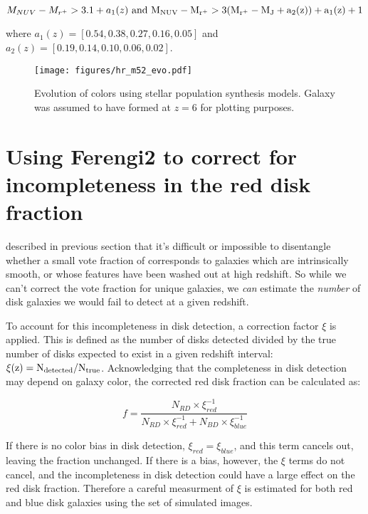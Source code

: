 \begin{equation}
M_{NUV}-M_{r^{+}} > 3.1 + a_{1}(z)
~\rm and~
M_{NUV}-M_{r^{+}} > 3(M_{r^{+}}-M_{J} + a_{2}(z))+ a_{1}(z) + 1  
\end{equation}

where $a_{1}(z) = [0.54,0.38,0.27,0.16,0.05]$ and $a_{2}(z) = [0.19,0.14,0.10,0.06,0.02]$. 

\begin{figure}
\centering
\texttt{[image: figures/hr\_m52\_evo.pdf]} 
\caption{Evolution of colors using stellar population synthesis models. Galaxy was assumed to have formed at $z=6$ for plotting purposes.}
\label{fig:bcmodel}
\end{figure}

\section{Using Ferengi2 to correct for incompleteness in the red disk fraction}

described in previous section that it's difficult or impossible to disentangle whether a small vote fraction of \ffeatures corresponds to galaxies which are intrinsically smooth, or whose features have been washed out at high redshift. So while we can't correct the vote fraction for unique galaxies, we \emph{can} estimate the \emph{number} of disk galaxies we would fail to detect at a given redshift. 

To account for this incompleteness in disk detection, a correction factor $\xi$ is applied. This is defined as the number of disks detected divided by the true number of disks expected to exist in a given redshift interval: $\rm \xi(z)=N_{detected}/N_{true}$. Acknowledging that the completeness in disk detection may depend on galaxy color, the corrected red disk fraction can be calculated as:

\begin{equation}
f=\frac{N_{RD}\times \xi^{-1}_{red}}{N_{RD}\times \xi^{-1}_{red} + N_{BD} \times \xi^{-1}_{blue}}
\label{eqn:reddiskfraction}
\end{equation}

If there is no color bias in disk detection, $\xi_{red}=\xi_{blue}$, and this term cancels out, leaving the fraction unchanged. If there is a bias, however, the $\xi$ terms do not cancel, and the incompleteness in disk detection could have a large effect on the red disk fraction. Therefore a careful measurment of $\xi$ is estimated for both red and blue disk galaxies using the  set of simulated images.

